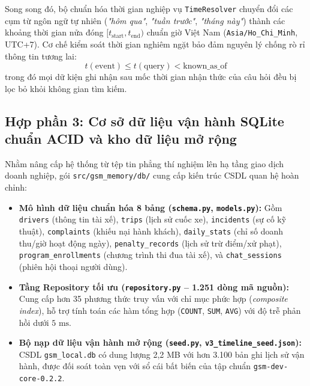 \documentclass[a4paper,11pt]{article}
\begin{document}
Song song đó, bộ chuẩn hóa thời gian nghiệp vụ \texttt{TimeResolver} chuyển đổi các cụm từ ngôn ngữ tự nhiên (\textit{"hôm qua"}, \textit{"tuần trước"}, \textit{"tháng này"}) thành các khoảng thời gian nửa đóng $[t_{\text{start}}, t_{\text{end}})$ chuẩn giờ Việt Nam (\texttt{Asia/Ho\_Chi\_Minh}, UTC+7). Cơ chế kiểm soát thời gian nghiêm ngặt bảo đảm nguyên lý chống rò rỉ thông tin tương lai:
\begin{equation}
    t(\text{event}) \le t(\text{query}) < \text{known\_as\_of}
    \label{eq:temporal-guard}
\end{equation}
trong đó mọi dữ kiện ghi nhận sau mốc thời gian nhận thức của câu hỏi đều bị lọc bỏ khỏi không gian tìm kiếm.

\subsection{Hợp phần 3: Cơ sở dữ liệu vận hành SQLite chuẩn ACID và kho dữ liệu mở rộng}
\label{sec:sqlite-db}

Nhằm nâng cấp hệ thống từ tệp tin phẳng thí nghiệm lên hạ tầng giao dịch doanh nghiệp, gói \nolinkurl{src/gsm_memory/db/} cung cấp kiến trúc CSDL quan hệ hoàn chỉnh:
\begin{itemize}[leftmargin=1.5em]
    \item \textbf{Mô hình dữ liệu chuẩn hóa 8 bảng (\nolinkurl{schema.py}, \nolinkurl{models.py}):} Gồm \texttt{drivers} (thông tin tài xế), \texttt{trips} (lịch sử cuốc xe), \texttt{incidents} (sự cố kỹ thuật), \texttt{complaints} (khiếu nại hành khách), \nolinkurl{daily_stats} (chỉ số doanh thu/giờ hoạt động ngày), \nolinkurl{penalty_records} (lịch sử trừ điểm/xử phạt), \nolinkurl{program_enrollments} (chương trình thi đua tài xế), và \nolinkurl{chat_sessions} (phiên hội thoại người dùng).
    \item \textbf{Tầng Repository tối ưu (\nolinkurl{repository.py} -- 1.251 dòng mã nguồn):} Cung cấp hơn 35 phương thức truy vấn với chỉ mục phức hợp (\textit{composite index}), hỗ trợ tính toán các hàm tổng hợp (\texttt{COUNT}, \texttt{SUM}, \texttt{AVG}) với độ trễ phản hồi dưới $5\text{ ms}$.
    \item \textbf{Bộ nạp dữ liệu vận hành mở rộng (\nolinkurl{seed.py}, \nolinkurl{v3_timeline_seed.json}):} CSDL \nolinkurl{gsm_local.db} có dung lượng 2,2 MB với hơn 3.100 bản ghi lịch sử vận hành, được đối soát toàn vẹn với sổ cái bất biến của tập chuẩn \texttt{gsm-dev-core-0.2.2}.
\end{itemize}
\end{document}
